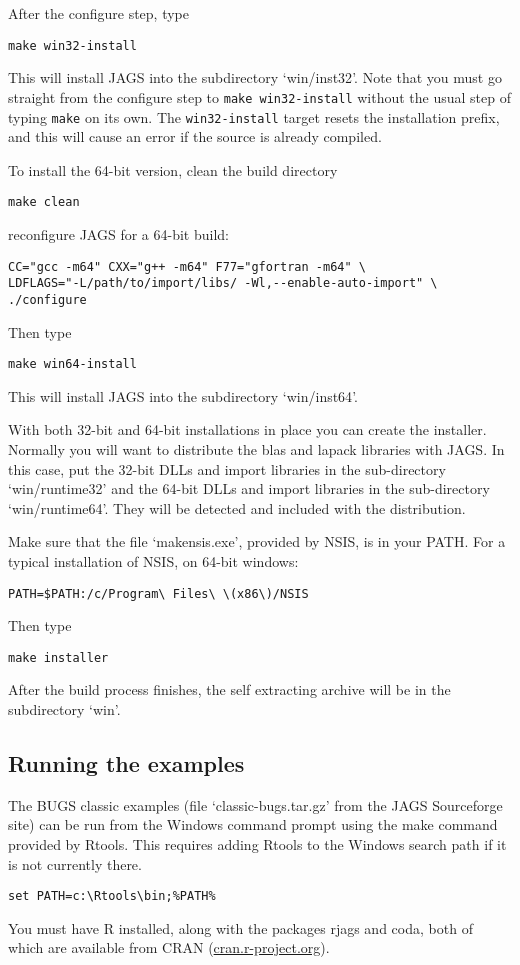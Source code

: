 \documentclass[11pt, a4paper, titlepage]{article}
\newcommand{\code}[1]{{\bgroup{\normalfont\ttfamily #1}\egroup}}
\newcommand{\file}[1]{{`\normalfont\textsf{#1}'}}
\let\command=\code
\begin{document}
After the configure step, type
\begin{verbatim}
make win32-install
\end{verbatim}
This will install JAGS into the subdirectory \file{win/inst32}.
Note that you must go straight from the configure step to \texttt{make
  win32-install} without the usual step of typing \texttt{make} on
its own.  The \texttt{win32-install} target resets the installation
prefix, and this will cause an error if the source is already
compiled.

To install the 64-bit version, clean the build directory 
\begin{verbatim}
make clean 
\end{verbatim}
reconfigure JAGS for a 64-bit build:
\begin{verbatim}
CC="gcc -m64" CXX="g++ -m64" F77="gfortran -m64" \
LDFLAGS="-L/path/to/import/libs/ -Wl,--enable-auto-import" \
./configure
\end{verbatim}
Then type
\begin{verbatim}
make win64-install
\end{verbatim}
This will install JAGS into the subdirectory \file{win/inst64}.

With both 32-bit and 64-bit installations in place you can create the
installer.  Normally you will want to distribute the blas and lapack
libraries with JAGS.  In this case, put the 32-bit DLLs and import
libraries in the sub-directory \file{win/runtime32} and the 64-bit
DLLs and import libraries in the sub-directory
\file{win/runtime64}. They will be detected and included with the
distribution.

Make sure that the file \file{makensis.exe}, provided by
NSIS, is in your PATH. For a typical installation of NSIS, on 64-bit
windows:
\begin{verbatim}
PATH=$PATH:/c/Program\ Files\ \(x86\)/NSIS
\end{verbatim}
Then type
\begin{verbatim}
make installer
\end{verbatim}
After the build process finishes, the self extracting archive will be
in the subdirectory \file{win}.

\subsection{Running the examples}

The BUGS classic examples (file \file{classic-bugs.tar.gz} from the JAGS
Sourceforge site) can be run from the Windows command prompt using
the \command{make} command provided by Rtools. This requires adding Rtools
to the Windows search path if it is not currently there.
\begin{verbatim}
set PATH=c:\Rtools\bin;%PATH%
\end{verbatim}
You must have R installed, along with the packages \code{rjags} and
\code{coda}, both of which are available from CRAN
(\url{cran.r-project.org}).
\end{document}
